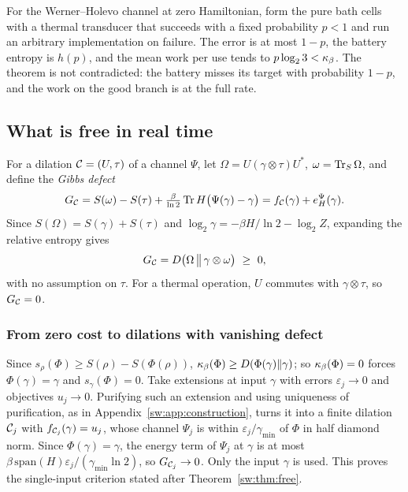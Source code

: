 \begin{remark}\label{sw:rem:wernermean}
For the Werner--Holevo channel at zero Hamiltonian, form the pure bath cells with a thermal transducer that succeeds with a fixed probability $p<1$ and run an arbitrary implementation on failure. The error is at most $1-p$, the battery entropy is $h(p)$, and the mean work per use tends to $p\log_23<\kappa_\beta$. The theorem is not contradicted: the battery misses its target with probability $1-p$, and the work on the good branch is at the full rate.
\end{remark}

\subsection{What is free in real time}\label{sw:app:zero-set}

For a dilation $\mathcal C=(U,\tau)$ of a channel $\Psi$, let $\Omega=U(\gamma\otimes\tau)U^*$, $\omega=\operatorname{Tr}_S\Omega$, and define the \emph{Gibbs defect}
\[
G_{\mathcal C}=S(\omega)-S(\tau)+\tfrac{\beta}{\ln2}\operatorname{Tr} H\bigl(\Psi(\gamma)-\gamma\bigr)=f_{\mathcal C}(\gamma)+e_H^\Psi(\gamma).
\]
Since $S(\Omega)=S(\gamma)+S(\tau)$ and $\log_2\gamma=-\beta H/\ln2-\log_2Z$, expanding the relative entropy gives
\begin{equation}\label{sw:eq:defect}
G_{\Dil}=D\bigl(\Omega\,\big\|\,\gamma\otimes\omega\bigr)\ \ge\ 0,
\end{equation}
with no assumption on $\tau$. For a thermal operation, $U$ commutes with $\gamma\otimes\tau$, so $G_{\mathcal C}=0$.

\subsubsection{From zero cost to dilations with vanishing defect}

Since $s_\rho(\Phi)\ge S(\rho)-S(\Phi(\rho))$, $\kappa_\beta(\Phi)\ge D(\Phi(\gamma)\|\gamma)$; so $\kappa_\beta(\Phi)=0$ forces $\Phi(\gamma)=\gamma$ and $s_\gamma(\Phi)=0$. Take extensions at input $\gamma$ with errors $\varepsilon_j\to0$ and objectives $u_j\to0$. Purifying such an extension and using uniqueness of purification, as in Appendix~\ref{sw:app:construction}, turns it into a finite dilation $\mathcal C_j$ with $f_{\mathcal C_j}(\gamma)=u_j$, whose channel $\Psi_j$ is within $\varepsilon_j/\gamma_{\min}$ of $\Phi$ in half diamond norm. Since $\Phi(\gamma)=\gamma$, the energy term of $\Psi_j$ at $\gamma$ is at most $\beta\,\mathrm{span}(H)\varepsilon_j/(\gamma_{\min}\ln2)$, so $G_{\mathcal C_j}\to0$. Only the input $\gamma$ is used. This proves the single-input criterion stated after Theorem~\ref{sw:thm:free}.

